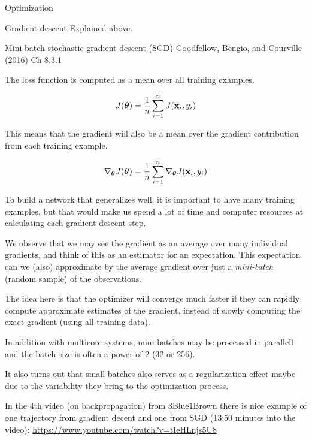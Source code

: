 \documentclass[
  ignorenonframetext,
]{beamer}
\begin{document}
\begin{frame}{Optimization}
\protect\hypertarget{optimization}{}
\begin{block}{Gradient descent}
\protect\hypertarget{gradient-descent-1}{}
Explained above.
\end{block}

\begin{block}{Mini-batch stochastic gradient descent (SGD)}
\protect\hypertarget{mini-batch-stochastic-gradient-descent-sgd}{}
Goodfellow, Bengio, and Courville (2016) Ch 8.3.1

The loss function is computed as a mean over all training examples.

\[J({\boldsymbol \theta})=\frac{1}{n}\sum_{i=1}^n J({\bf x}_i, y_i)\]

This means that the gradient will also be a mean over the gradient
contribution from each training example.

\[\nabla_{\boldsymbol \theta} J({\boldsymbol \theta})=\frac{1}{n}\sum_{i=1}^n \nabla_{\boldsymbol \theta} J({\bf x}_i, y_i)\]
\end{block}
\end{frame}

\begin{frame}
To build a network that generalizes well, it is important to have many
training examples, but that would make us spend a lot of time and
computer resources at calculating each gradient descent step.

We observe that we may see the gradient as an average over many
individual gradients, and think of this as an estimator for an
expectation. This expectation can we (also) approximate by the average
gradient over just a \emph{mini-batch} (random sample) of the
observations.

The idea here is that the optimizer will converge much faster if they
can rapidly compute approximate estimates of the gradient, instead of
slowly computing the exact gradient (using all training data).

In addition with multicore systems, mini-batches may be processed in
parallell and the batch size is often a power of 2 (32 or 256).

It also turns out that small batches also serves as a regularization
effect maybe due to the variability they bring to the optimization
process.
\end{frame}

\begin{frame}
In the 4th video (on backpropagation) from 3Blue1Brown there is nice
example of one trajectory from gradient decent and one from SGD (13:50
minutes into the video):
\url{https://www.youtube.com/watch?v=tIeHLnjs5U8}
\end{frame}
\end{document}
